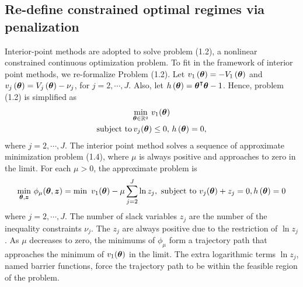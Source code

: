 \subsection{Re-define constrained optimal regimes  via penalization} %
 Interior-point methods are adopted to solve problem (1.2), a nonlinear constrained continuous optimization problem. To fit in the framework of interior point methods, we re-formalize Problem (1.2). Let $v_1\left(\boldsymbol{\theta}\right)=- V_1\left(\boldsymbol{\theta}\right)$ and  $v_j\left(\boldsymbol{\theta}\right) = V_j\left(\boldsymbol{\theta}\right) - \nu_j$, for $j = 2, \cdots, J$. Also, let $h\left(\boldsymbol{\theta}\right) = \boldsymbol{\theta}^{\intercal}\boldsymbol{\theta}-1$. Hence,  problem (1.2) is simplified as
 \begin{equation}
 \begin{gathered}
 \min_{\boldsymbol{\theta} \in \mathbb{R}^q} \, v_1(\boldsymbol{\theta}) \\ 
 \text{subject to}  \, v_j(\boldsymbol{\theta}) \le 0,\, h\left(\boldsymbol{\theta}\right)=0,
 \end{gathered}
 \end{equation}
 where  $j = 2, \cdots, J$. The interior point method solves a sequence of approximate minimization problem (1.4), where $\mu$ is always positive and approaches to zero in the limit. For each $\mu >0$, the approximate problem is 
 \begin{equation}
 \begin{gathered}
 \min_{\boldsymbol{\theta}, \boldsymbol{z}} \, \phi_{\mu}(\boldsymbol{\theta}, \boldsymbol{z}) = \min \,\,v_1(\boldsymbol{\theta}) - \mu \sum_{j=2}^J \ln z_j, \text{ subject to } v_j(\boldsymbol{\theta})  + z_j = 0, h\left(\boldsymbol{\theta}\right) = 0
 \end{gathered}
 \end{equation}
where  $j = 2, \cdots, J$. The number of slack variables $z_j$ are the number of the inequality constraints $\nu_j$. The $z_j$ are always positive due to the restriction of $\ln z_j$. As $\mu$ decreases to zero, the minimums of $\phi_\mu$ form a trajectory path that approaches the minimum of $v_1(\boldsymbol{\theta})$ in the limit. The extra logarithmic terms $\ln z_j$, named barrier functions, force the trajectory path to be within the feasible region of the problem.\\
 
